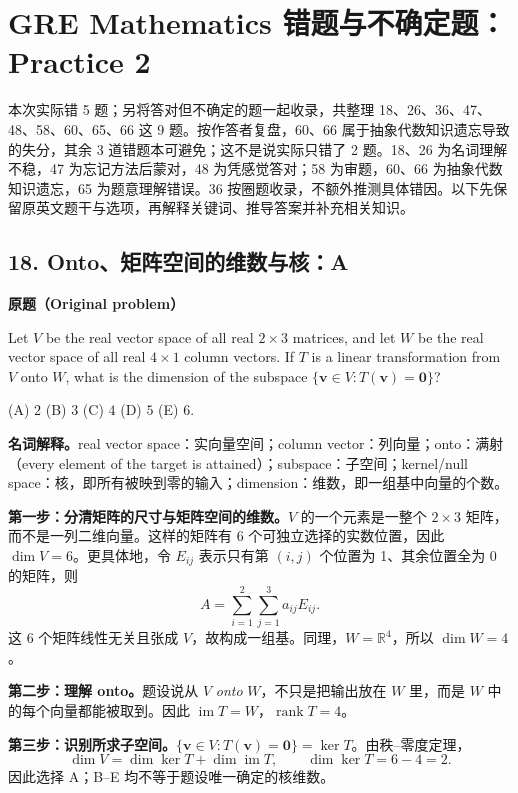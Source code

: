 \documentclass[11pt,a4paper,fontset=fandol]{ctexart}
\begin{document}
\clearpage
\section{GRE Mathematics 错题与不确定题：Practice 2}
本次实际错 5 题；另将答对但不确定的题一起收录，共整理 18、26、36、47、48、58、60、65、66 这 9 题。按作答者复盘，60、66 属于抽象代数知识遗忘导致的失分，其余 3 道错题本可避免；这不是说实际只错了 2 题。18、26 为名词理解不稳，47 为忘记方法后蒙对，48 为凭感觉答对；58 为审题，60、66 为抽象代数知识遗忘，65 为题意理解错误。36 按圈题收录，不额外推测具体错因。以下先保留原英文题干与选项，再解释关键词、推导答案并补充相关知识。

\subsection{18. Onto、矩阵空间的维数与核：A}
\label{p2:q18}
\textbf{原题（Original problem）}

Let $V$ be the real vector space of all real $2\times3$ matrices, and let $W$ be the real vector space of all real $4\times1$ column vectors. If $T$ is a linear transformation from $V$ onto $W$, what is the dimension of the subspace $\{\mathbf v\in V:T(\mathbf v)=\mathbf0\}$?

(A) $2$ \quad (B) $3$ \quad (C) $4$ \quad (D) $5$ \quad (E) $6$.

\textbf{名词解释。}real vector space：实向量空间；column vector：列向量；onto：满射（every element of the target is attained）；subspace：子空间；kernel/null space：核，即所有被映到零的输入；dimension：维数，即一组基中向量的个数。

\textbf{第一步：分清矩阵的尺寸与矩阵空间的维数。}$V$ 的一个元素是一整个 $2\times3$ 矩阵，而不是一列二维向量。这样的矩阵有 6 个可独立选择的实数位置，因此 $\dim V=6$。更具体地，令 $E_{ij}$ 表示只有第 $(i,j)$ 个位置为 1、其余位置全为 0 的矩阵，则
\[
A=\sum_{i=1}^{2}\sum_{j=1}^{3}a_{ij}E_{ij}.
\]
这 6 个矩阵线性无关且张成 $V$，故构成一组基。同理，$W=\mathbb R^4$，所以 $\dim W=4$。

\textbf{第二步：理解 onto。}题设说从 $V$ \emph{onto} $W$，不只是把输出放在 $W$ 里，而是 $W$ 中的每个向量都能被取到。因此 $\operatorname{im}T=W$，$\operatorname{rank}T=4$。

\textbf{第三步：识别所求子空间。}$\{\mathbf v\in V:T(\mathbf v)=\mathbf0\}=\ker T$。由秩--零度定理，
\begin{equation}
\dim V=\dim\ker T+\dim\operatorname{im}T,
\qquad \dim\ker T=6-4=\boxed{2}.
\label{p2:rank-nullity}
\end{equation}
因此选择 A；B--E 均不等于题设唯一确定的核维数。
\end{document}
